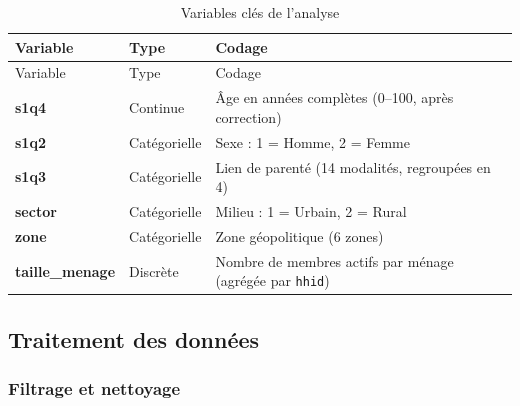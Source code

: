\documentclass[
  10pt,
]{article}
\begin{document}
\begin{longtable}[]{@{}
  >{\raggedright\arraybackslash}p{}
  >{\raggedright\arraybackslash}p{}
  >{\raggedright\arraybackslash}p{}@{}}
\caption{Variables clés de
l'analyse}\label{tbl-variables}\tabularnewline
\toprule\noalign{}
\begin{minipage}[b]{\linewidth}\raggedright
Variable
\end{minipage} & \begin{minipage}[b]{\linewidth}\raggedright
Type
\end{minipage} & \begin{minipage}[b]{\linewidth}\raggedright
Codage
\end{minipage} \\
\midrule\noalign{}
\endfirsthead
\toprule\noalign{}
\begin{minipage}[b]{\linewidth}\raggedright
Variable
\end{minipage} & \begin{minipage}[b]{\linewidth}\raggedright
Type
\end{minipage} & \begin{minipage}[b]{\linewidth}\raggedright
Codage
\end{minipage} \\
\midrule\noalign{}
\endhead
\bottomrule\noalign{}
\endlastfoot
\textbf{s1q4} & Continue & Âge en années complètes (0--100, après
correction) \\
\textbf{s1q2} & Catégorielle & Sexe : 1 = Homme, 2 = Femme \\
\textbf{s1q3} & Catégorielle & Lien de parenté (14 modalités, regroupées
en 4) \\
\textbf{sector} & Catégorielle & Milieu : 1 = Urbain, 2 = Rural \\
\textbf{zone} & Catégorielle & Zone géopolitique (6 zones) \\
\textbf{taille\_menage} & Discrète & Nombre de membres actifs par ménage
(agrégée par \texttt{hhid}) \\
\end{longtable}

\subsection{Traitement des données}\label{traitement-des-donnuxe9es}

\subsubsection{Filtrage et nettoyage}\label{filtrage-et-nettoyage}
\end{document}
